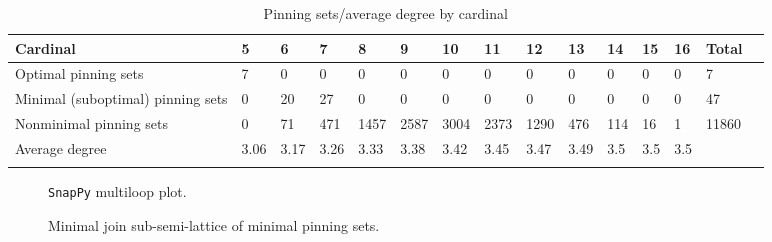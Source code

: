 \documentclass{article}%
\begin{document}
\begin{table}[ht]
	\caption{Pinning sets/average degree by cardinal}
	\centering
	\renewcommand{\arraystretch}{1.5}
	\begin{tabularx}{\textwidth}{lXXXXXXXXXXXXXX}
		\toprule
			Cardinal & 5 & 6 & 7 & 8 & 9 & 10 & 11 & 12 & 13 & 14 & 15 & 16 & Total\\
			\hline
			Optimal pinning sets & 7 & 0 & 0 & 0 & 0 & 0 & 0 & 0 & 0 & 0 & 0 & 0 & 7 \\
			Minimal (suboptimal) pinning sets & 0 & 20 & 27 & 0 & 0 & 0 & 0 & 0 & 0 & 0 & 0 & 0 & 47 \\
			Nonminimal pinning sets & 0 & 71 & 471 & 1457 & 2587 & 3004 & 2373 & 1290 & 476 & 114 & 16 & 1 & 11860 \\
			Average degree & 3.06 & 3.17 & 3.26 & 3.33 & 3.38 & 3.42 & 3.45 & 3.47 & 3.49 & 3.5 & 3.5 & 3.5 &  \\
		\bottomrule \\ 
	\end{tabularx}
\end{table}

\begin{multicols}{2}
\begin{figure}[H]
\centering

\caption{\texttt{SnapPy} multiloop plot.}
\label{fig:tex/img/[[7, 28, 8, 1], [19, 6, 20, 7], [14, 27, 15, 28], [8, 15, 9, 16], [1, 25, 2, 24], [18, 23, 19, 24], [12, 5, 13, 6], [20, 13, 21, 14], [26, 9, 27, 10], [16, 26, 17, 25], [2, 17, 3, 18], [11, 22, 12, 23.svg}
\end{figure}
\columnbreak

\begin{figure}[H]
\centering
\scalebox{0.8}{}
\caption{Minimal join sub-semi-lattice of minimal pinning sets.}
\label{fig:tex/img/[[7, 28, 8, 1], [19, 6, 20, 7], [14, 27, 15, 28], [8, 15, 9, 16], [1, 25, 2, 24], [18, 23, 19, 24], [12, 5, 13, 6], [20, 13, 21, 14], [26, 9, 27, 10], [16, 26, 17, 25], [2, 17, 3, 18], [11, 22, 12, 23.pgf}
\end{figure}
\end{multicols}
\end{document}
